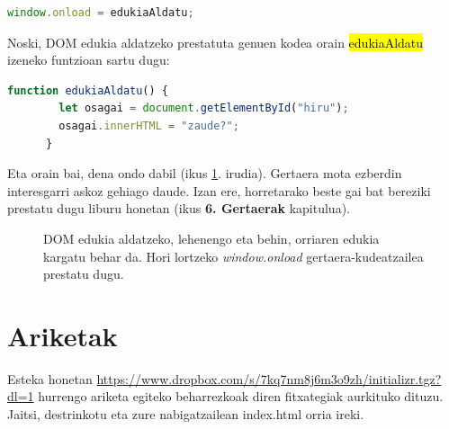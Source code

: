 \begin{lstlisting}[language=JavaScript, numbers=none]
   window.onload = edukiaAldatu;
\end{lstlisting}

Noski, DOM edukia aldatzeko prestatuta genuen kodea orain \hl{edukiaAldatu} izeneko funtzioan sartu dugu:

\begin{lstlisting}[language=JavaScript]
 function edukiaAldatu() {
        let osagai = document.getElementById("hiru");
        osagai.innerHTML = "zaude?";
      }
\end{lstlisting}

Eta orain bai, dena ondo dabil (ikus \ref{fig:onload}. irudia). Gertaera mota ezberdin interesgarri askoz gehiago daude. Izan ere, horretarako beste gai bat bereziki prestatu dugu liburu honetan (ikus \textbf{6. Gertaerak} kapitulua).

\begin{figure}[ht]
	\centering
{}
\caption{DOM edukia aldatzeko, lehenengo eta behin, orriaren edukia kargatu behar da. Hori lortzeko \textit{window.onload} gertaera-kudeatzailea prestatu dugu.}
\label{fig:onload}
\end{figure}


\section{Ariketak}

Esteka honetan \href{https://labur.eus/WOXzZ}{https://www.dropbox.com/s/7kq7nm8j6m3o9zh/initializr.tgz?dl=1} hurrengo ariketa egiteko beharrezkoak diren fitxategiak aurkituko
dituzu. Jaitsi, destrinkotu eta zure nabigatzailean
index.html orria ireki.

